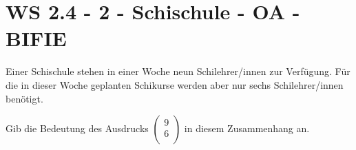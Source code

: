 \section{WS 2.4 - 2 - Schischule - OA - BIFIE}


\begin{beispiel}[WS 2.4]{1} %
Einer Schischule stehen in einer Woche neun Schilehrer/innen zur Verfügung. Für die in dieser
Woche geplanten Schikurse werden aber nur sechs Schilehrer/innen benötigt.


Gib die Bedeutung des Ausdrucks 
$\begin{pmatrix}
9 \\
6\\	
\end{pmatrix}$ in diesem Zusammenhang an. 

\end{beispiel}